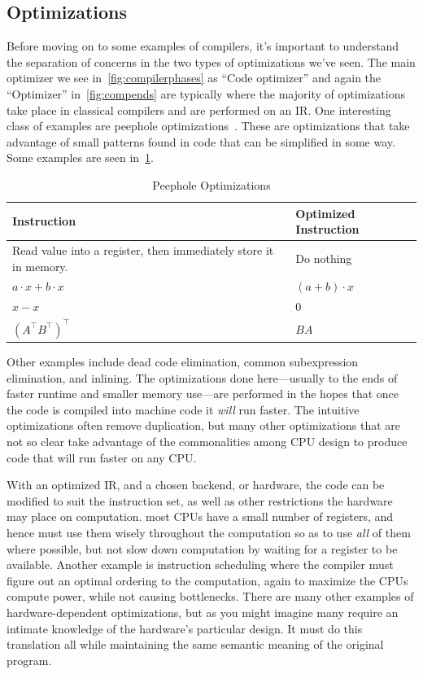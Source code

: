 \subsection{Optimizations}

Before moving on to some examples of compilers, it's important to understand the separation of concerns in the two types of optimizations we've seen.
The main optimizer we see in~\cref{fig:compilerphases} as ``Code optimizer'' and again the ``Optimizer'' in~\cref{fig:compends} are typically where the majority of optimizations take place in classical compilers and are performed on an \ac{IR}.
One interesting class of examples are peephole optimizations~\cite{classical-peephole}.
These are optimizations that take advantage of small patterns found in code that can be simplified in some way.
Some examples are seen in~\cref{tab:peephole}.
\begin{table}[ht]
    \centering
    \begin{tabular}{p{}l}
        Instruction                                                      & Optimized Instruction \\ \toprule
        Read value into a register, then immediately store it in memory. & Do nothing            \\
        $a \cdot x + b \cdot x$                                          & $(a + b) \cdot x$     \\
        $x - x$                                                          & $0$                   \\
        $(A^\intercal B^\intercal)^\intercal$                            & $BA$
    \end{tabular}
    \caption{Peephole Optimizations}\label{tab:peephole}
\end{table}
Other examples include dead code elimination, common subexpression elimination, and inlining.
The optimizations done here---usually to the ends of faster runtime and smaller memory use---are performed in the hopes that once the code is compiled into machine code it \emph{will} run faster.
The intuitive optimizations often remove duplication, but many other optimizations that are not so clear take advantage of the commonalities among \ac{CPU} design to produce code that will run faster on any \ac{CPU}.

With an optimized \ac{IR}, and a chosen backend, or hardware, the code can be modified to suit the instruction set, as well as other restrictions the hardware may place on computation.
\Eg{} most \acp{CPU} have a small number of registers, and hence must use them wisely throughout the computation so as to use \emph{all} of them where possible, but not slow down computation by waiting for a register to be available.
Another example is instruction scheduling where the compiler must figure out an optimal ordering to the computation, again to maximize the \acp{CPU} compute power, while not causing bottlenecks.
There are many other examples of hardware-dependent optimizations, but as you might imagine many require an intimate knowledge of the hardware's particular design.
It must do this translation all while maintaining the same semantic meaning of the original program.

